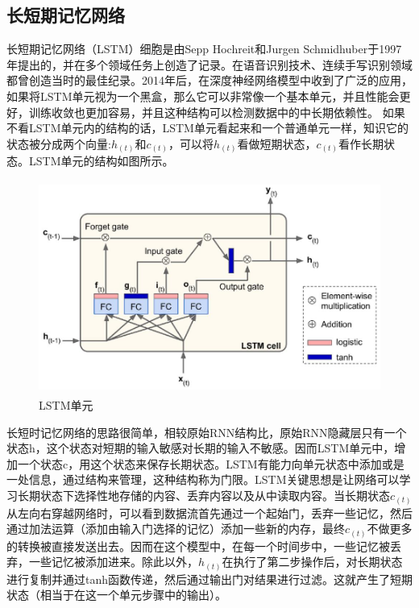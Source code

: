\documentclass[winfonts,master,oneside,nobackinfo]{njuthesis}
\begin{document}
\subsection{长短期记忆网络}

长短期记忆网络（LSTM）细胞是由Sepp Hochreit和Jurgen Schmidhuber于1997年提出的\cite{Hochreit}，并在多个领域任务上创造了记录。在语音识别技术、连续手写识别领域都曾创造当时的最佳纪录。2014年后，在深度神经网络模型中收到了广泛的应用，如果将LSTM单元视为一个黑盒，那么它可以非常像一个基本单元，并且性能会更好，训练收敛也更加容易，并且这种结构可以检测数据中的中长期依赖性。
如果不看LSTM单元内的结构的话，LSTM单元看起来和一个普通单元一样，知识它的状态被分成两个向量:${ h } _ { ( t ) }$和$ { c } _ { ( t ) }$，可以将${ h } _ { ( t ) }$看做短期状态，${ c } _ { ( t ) }$看作长期状态。LSTM单元的结构如图所示。



\begin{figure}[h]
\centering
\begin{minipage}[t]{\textwidth}
\includegraphics[width=1.0\textwidth,height=7.0cm]{./figure/LSTM.jpg}
\caption{LSTM单元}
\label{lab:1}
\end{minipage}
\end{figure}

长短时记忆网络的思路很简单，相较原始RNN结构比，原始RNN隐藏层只有一个状态h，这个状态对短期的输入敏感对长期的输入不敏感。因而LSTM单元中，增加一个状态c，用这个状态来保存长期状态。LSTM有能力向单元状态中添加或是一处信息，通过结构来管理，这种结构称为门限。LSTM关键思想是让网络可以学习长期状态下选择性地存储的内容、丢弃内容以及从中读取内容。当长期状态${ c } _ { ( t ) }$从左向右穿越网络时，可以看到数据流首先通过一个起始门，丢弃一些记忆，然后通过加法运算（添加由输入门选择的记忆）添加一些新的内存，最终${ c } _ { ( t ) }$不做更多的转换被直接发送出去。因而在这个模型中，在每一个时间步中，一些记忆被丢弃，一些记忆被添加进来。除此以外，${ h } _ { ( t ) }$在执行了第二步操作后，对长期状态进行复制并通过tanh函数传递，然后通过输出门对结果进行过滤。这就产生了短期状态（相当于在这一个单元步骤中的输出）。
\end{document}
